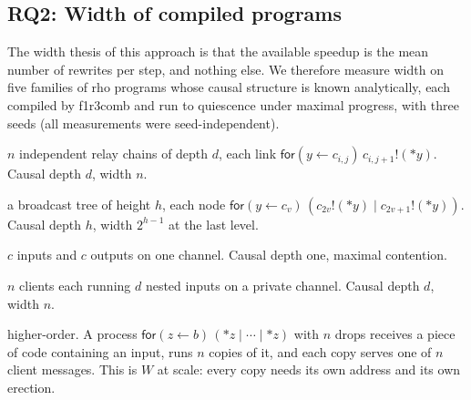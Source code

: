 \documentclass[acmsmall,screen,review,anonymous]{acmart}
\newcommand{\drp}[1]{{*}#1}
\newcommand{\inp}[3]{\mathsf{for}(#1 \leftarrow #2)\,#3}
\newcommand{\out}[2]{#1!(#2)}
\newcommand{\tool}{\textsf{f1r3comb}}
\begin{document}
\subsection{RQ2: Width of compiled programs}
\label{sec:eval-width}

The width thesis of this approach is that the available speedup is the mean
number of rewrites per step, and nothing else. We therefore measure width on
five families of rho programs whose causal structure is known analytically,
each compiled by \tool{} and run to quiescence under maximal progress, with
three seeds (all measurements were seed-independent).
\begin{description}[leftmargin=1.5em,style=unboxed]
\item[fan$(n,d)$:] $n$ independent relay chains of depth $d$, each link
  $\inp{y}{c_{i,j}}{\out{c_{i,j+1}}{\drp{y}}}$. Causal depth $d$, width $n$.
\item[bcast$(h)$:] a broadcast tree of height $h$, each node
  $\inp{y}{c_{v}}{(\out{c_{2v}}{\drp{y}} \mid \out{c_{2v+1}}{\drp{y}})}$. Causal
  depth $h$, width $2^{h-1}$ at the last level.
\item[contend$(c)$:] $c$ inputs and $c$ outputs on one channel. Causal depth
  one, maximal contention.
\item[nested$(n,d)$:] $n$ clients each running $d$ nested inputs on a private
  channel. Causal depth $d$, width $n$.
\item[ship$(n)$:] higher-order. A process
  $\inp{z}{b}{(\drp{z} \mid \cdots \mid \drp{z})}$ with $n$ drops receives a
  piece of code containing an input, runs $n$ copies of it, and each copy
  serves one of $n$ client messages. This is $W$ at scale: every copy needs
  its own address and its own erection.
\end{description}
\end{document}
